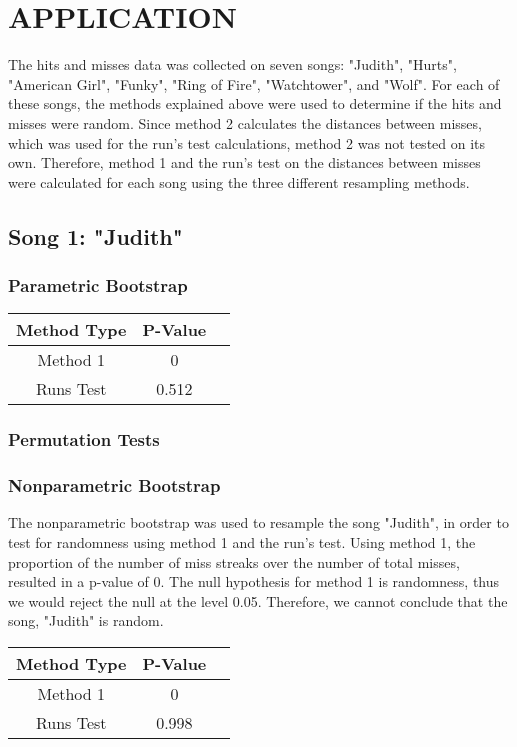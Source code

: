\documentclass[12pt, letterpaper]{article}
\begin{document}
\section{APPLICATION}
The hits and misses data was collected on seven songs: "Judith", "Hurts", "American Girl", "Funky", "Ring of Fire", "Watchtower", and "Wolf". For each of these songs, the methods explained above were used to determine if the hits and misses were random. Since method 2 calculates the distances between misses, which was used for the run's test calculations, method 2 was not tested on its own. Therefore, method 1 and the run's test on the distances between misses were calculated for each song using the three different resampling methods.
\subsection{Song 1: "Judith"}

\subsubsection{Parametric Bootstrap}
\begin{tabular}{|c|c|c|}
\hline
\textbf{Method Type} & P-Value \\
\hline
Method 1 & 0 \\
\hline
Runs Test & 0.512 \\ 
\hline
\end{tabular}


\subsubsection{Permutation Tests}

\subsubsection{Nonparametric Bootstrap}
The nonparametric bootstrap was used to resample the song "Judith", in order to test for randomness using method 1 and the run's test.  Using method 1, the proportion of the number of miss streaks over the number of total misses, resulted in a p-value of 0. The null hypothesis for method 1 is randomness, thus we would reject the null at the level 0.05. Therefore, we  cannot conclude that the song, "Judith" is random. 


\begin{tabular}{|c|c|c|}
\hline
\textbf{Method Type} & P-Value \\
\hline
Method 1 & 0 \\
\hline
Runs Test & 0.998 \\ 
\hline
\end{tabular}
\end{document}
